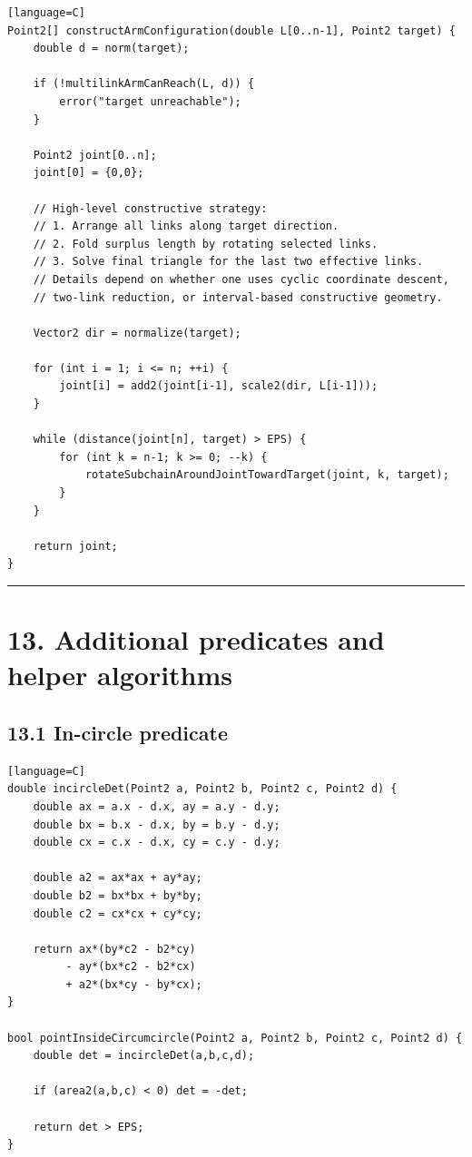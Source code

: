 \documentclass[11pt]{article}
\begin{document}
\begin{verbatim}[language=C]
Point2[] constructArmConfiguration(double L[0..n-1], Point2 target) {
    double d = norm(target);

    if (!multilinkArmCanReach(L, d)) {
        error("target unreachable");
    }

    Point2 joint[0..n];
    joint[0] = {0,0};

    // High-level constructive strategy:
    // 1. Arrange all links along target direction.
    // 2. Fold surplus length by rotating selected links.
    // 3. Solve final triangle for the last two effective links.
    // Details depend on whether one uses cyclic coordinate descent,
    // two-link reduction, or interval-based constructive geometry.

    Vector2 dir = normalize(target);

    for (int i = 1; i <= n; ++i) {
        joint[i] = add2(joint[i-1], scale2(dir, L[i-1]));
    }

    while (distance(joint[n], target) > EPS) {
        for (int k = n-1; k >= 0; --k) {
            rotateSubchainAroundJointTowardTarget(joint, k, target);
        }
    }

    return joint;
}
\end{verbatim}

\begin{center}\rule{0.5\linewidth}{0.5pt}\end{center}

\section{13. Additional predicates and helper
algorithms}\label{additional-predicates-and-helper-algorithms}

\subsection{13.1 In-circle predicate}\label{in-circle-predicate}

\begin{verbatim}[language=C]
double incircleDet(Point2 a, Point2 b, Point2 c, Point2 d) {
    double ax = a.x - d.x, ay = a.y - d.y;
    double bx = b.x - d.x, by = b.y - d.y;
    double cx = c.x - d.x, cy = c.y - d.y;

    double a2 = ax*ax + ay*ay;
    double b2 = bx*bx + by*by;
    double c2 = cx*cx + cy*cy;

    return ax*(by*c2 - b2*cy)
         - ay*(bx*c2 - b2*cx)
         + a2*(bx*cy - by*cx);
}

bool pointInsideCircumcircle(Point2 a, Point2 b, Point2 c, Point2 d) {
    double det = incircleDet(a,b,c,d);

    if (area2(a,b,c) < 0) det = -det;

    return det > EPS;
}
\end{verbatim}
\end{document}
